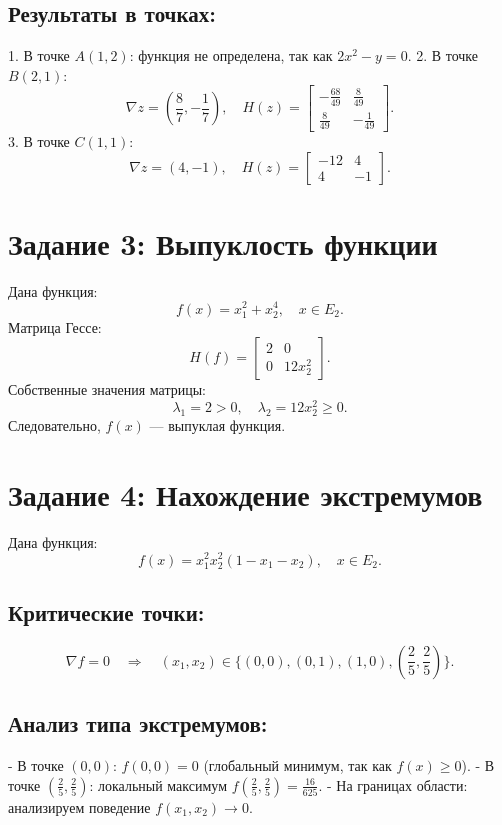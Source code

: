 \documentclass[a4paper,12pt]{article}
\begin{document}
\subsection*{Результаты в точках:}
1. В точке \( A(1, 2) \): функция не определена, так как \( 2x^2 - y = 0 \).
2. В точке \( B(2, 1) \):
\[
\nabla z = \left( \frac{8}{7}, -\frac{1}{7} \right), \quad
H(z) =
\begin{bmatrix}
-\frac{68}{49} & \frac{8}{49} \\
\frac{8}{49} & -\frac{1}{49}
\end{bmatrix}.
\]
3. В точке \( C(1, 1) \):
\[
\nabla z = (4, -1), \quad
H(z) =
\begin{bmatrix}
-12 & 4 \\
4 & -1
\end{bmatrix}.
\]

\section*{Задание 3: Выпуклость функции}
Дана функция:
\[
f(x) = x_1^2 + x_2^4, \quad x \in E_2.
\]
Матрица Гессе:
\[
H(f) =
\begin{bmatrix}
2 & 0 \\
0 & 12x_2^2
\end{bmatrix}.
\]
Собственные значения матрицы:
\[
\lambda_1 = 2 > 0, \quad \lambda_2 = 12x_2^2 \geq 0.
\]
Следовательно, \( f(x) \) — выпуклая функция.

\section*{Задание 4: Нахождение экстремумов}
Дана функция:
\[
f(x) = x_1^2 x_2^2 (1 - x_1 - x_2), \quad x \in E_2.
\]

\subsection*{Критические точки:}
\[
\nabla f = 0 \quad \Rightarrow \quad 
(x_1, x_2) \in \{ (0, 0), (0, 1), (1, 0), (\frac{2}{5}, \frac{2}{5}) \}.
\]

\subsection*{Анализ типа экстремумов:}
- В точке \( (0, 0) \): \( f(0, 0) = 0 \) (глобальный минимум, так как \( f(x) \geq 0 \)).
- В точке \( (\frac{2}{5}, \frac{2}{5}) \): локальный максимум \( f(\frac{2}{5}, \frac{2}{5}) = \frac{16}{625} \).
- На границах области: анализируем поведение \( f(x_1, x_2) \to 0 \).
\end{document}
